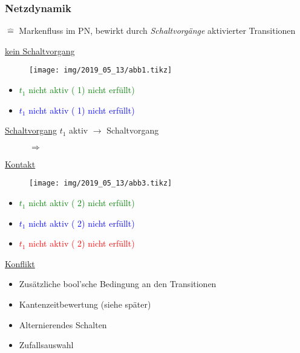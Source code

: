 \subsubsection{Netzdynamik} \label{sec:netzdynamik}
$\hat{=}$ Markenfluss im PN, bewirkt durch \textit{Schaltvorgänge} aktivierter Transitionen 

\underline{kein Schaltvorgang}

\begin{figure}[H]
	\centering
	\texttt{[image: img/2019\_05\_13/abb1.tikz]}
\end{figure}
\begin{itemize}
	\item \textcolor{green}{$t_1$ nicht aktiv ( 1) nicht erfüllt)}
	\item \textcolor{blue}{$t_1$ nicht aktiv ( 1) nicht erfüllt)}
\end{itemize}

\underline{Schaltvorgang}
$t_1$ aktiv $\rightarrow$ Schaltvorgang

\begin{figure}[H]
	\centering
	 \qquad $\Rightarrow$ \qquad
\end{figure}


\underline{Kontakt}

\begin{figure}[H]
	\centering
	\texttt{[image: img/2019\_05\_13/abb3.tikz]}
\end{figure}
\begin{itemize}
	\item \textcolor{green}{$t_1$ nicht aktiv ( 2) nicht erfüllt)}
	\item \textcolor{blue}{$t_1$ nicht aktiv ( 2) nicht erfüllt)}
	\item \textcolor{red}{$t_1$ nicht aktiv ( 2) nicht erfüllt)}
\end{itemize}

\underline{Konflikt}
\begin{figure}[H]
	\centering
	 \qquad \qquad \qquad
\end{figure}


\begin{itemize}
	\item Zusätzliche bool'sche Bedingung an den Transitionen
	\item Kantenzeitbewertung (siehe später)
	\item Alternierendes Schalten
	\item Zufallsauswahl
\end{itemize}

